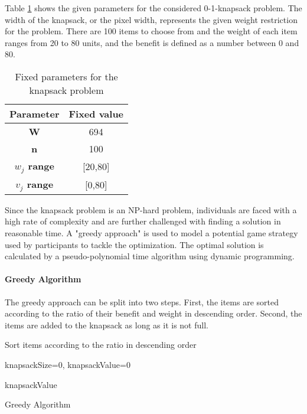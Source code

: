 Table \ref{tab:KnapsackParamters} shows the given parameters for the considered 0-1-knapsack problem. The width of the knapsack, or the pixel width, represents the given weight restriction for the problem. There are 100 items to choose from and the weight of each item ranges from 20 to 80 units, and the benefit is defined as a number between 0 and 80.
\begin{table}[h] %
  \centering
    \begin{tabular}{c|c}
    \textbf{Parameter} & \multicolumn{1}{c}{\textbf{Fixed value}} \bigstrut[b]\\
    \hline
    \textbf{W} & 694 \bigstrut\\
    \hline
    \textbf{n} & 100 \bigstrut\\
    \hline
    \textbf{$w_j$ range} & \multicolumn{1}{c}{[20,80]} \bigstrut\\
    \hline
    \textbf{$v_j$ range} & \multicolumn{1}{c}{[0,80]} \bigstrut\\
    \hline
    \end{tabular}%
  \caption{Fixed parameters for the knapsack problem}
    \label{tab:KnapsackParamters}
\end{table}%
\newpage
Since the knapsack problem is an NP-hard problem, individuals are faced with a high rate of complexity and are further challenged with finding a solution in reasonable time. A "greedy approach" is used to model a potential game strategy used by participants to tackle the optimization.
The optimal solution is calculated by a pseudo-polynomial time algorithm using dynamic programming.


\paragraph{Greedy Algorithm}
The greedy approach can be split into two steps. First, the items are sorted according to the ratio of their benefit and weight in descending order. Second, the items are added to the knapsack as long as it is not full.\\

\begin{algorithm} %
\LinesNumbered
\setcounter{AlgoLine}{0}
\SetNoFillComment
 \SetAlgoLined
Sort items according to the ratio in descending order\;

knapsackSize=0, knapsackValue=0\;

\Return knapsackValue\;

\caption{Greedy Algorithm}
\end{algorithm}

